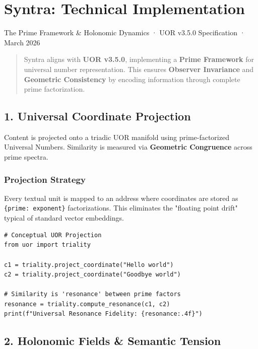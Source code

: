 \documentclass[12pt,a4paper]{article}
\begin{document}
\section{Syntra: Technical
Implementation}\label{syntra-technical-implementation}

The Prime Framework \& Holonomic Dynamics · UOR v3.5.0 Specification ·
March 2026

\begin{quote}
Syntra aligns with \textbf{UOR v3.5.0}, implementing a \textbf{Prime
Framework} for universal number representation. This ensures
\textbf{Observer Invariance} and \textbf{Geometric Consistency} by
encoding information through complete prime factorization.
\end{quote}

\subsection{1. Universal Coordinate
Projection}\label{universal-coordinate-projection}

Content is projected onto a triadic UOR manifold using prime-factorized
Universal Numbers. Similarity is measured via \textbf{Geometric
Congruence} across prime spectra.

\subsubsection{Projection Strategy}\label{projection-strategy}

Every textual unit is mapped to an address where coordinates are stored
as \texttt{\{prime:\ exponent\}} factorizations. This eliminates the
"floating point drift" typical of standard vector embeddings.

\begin{verbatim}
# Conceptual UOR Projection
from uor import triality

c1 = triality.project_coordinate("Hello world")
c2 = triality.project_coordinate("Goodbye world")

# Similarity is 'resonance' between prime factors
resonance = triality.compute_resonance(c1, c2)
print(f"Universal Resonance Fidelity: {resonance:.4f}")
\end{verbatim}

\subsection{2. Holonomic Fields \& Semantic
Tension}\label{holonomic-fields-semantic-tension}
\end{document}
